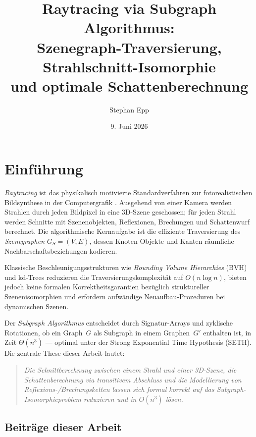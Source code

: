 ﻿\documentclass[a4paper,12pt]{article}
\title{\textbf{Raytracing via Subgraph Algorithmus:\\
Szenegraph-Traversierung, Strahlschnitt-Isomorphie\\
und optimale Schattenberechnung}}
\author{Stephan Epp}
\date{9. Juni 2026}
\theoremstyle{definition}
\begin{document}
\maketitle
\tableofcontents
\newpage

\section{Einführung}

\emph{Raytracing} ist das physikalisch motivierte Standardverfahren zur
fotorealistischen Bildsynthese in der Computergrafik \citep{Whitted1980}.
Ausgehend von einer Kamera werden Strahlen durch jeden Bildpixel in eine
3D-Szene geschossen; für jeden Strahl werden Schnitte mit Szenenobjekten,
Reflexionen, Brechungen und Schattenwurf berechnet. Die algorithmische
Kernaufgabe ist die effiziente Traversierung des \emph{Szenegraphen}
$G_S = (V, E)$, dessen Knoten Objekte und Kanten räumliche
Nachbarschaftsbeziehungen kodieren.

Klassische Beschleunigungsstrukturen wie \emph{Bounding Volume
Hierarchies} (BVH) \citep{Rubin1980} und kd-Trees \citep{Bentley1975}
reduzieren die Traversierungskomplexität auf $O(n \log n)$, bieten
jedoch keine formalen Korrektheitsgarantien bezüglich struktureller
Szenenisomorphien und erfordern aufwändige Neuaufbau-Prozeduren bei
dynamischen Szenen.

Der \emph{Subgraph Algorithmus} \citep{Epp2026} entscheidet durch
Signatur-Arrays und zyklische Rotationen, ob ein Graph~$G$ als Subgraph
in einem Graphen~$G'$ enthalten ist, in Zeit $\Theta(n^3)$ --- optimal
unter der Strong Exponential Time Hypothesis (SETH). Die zentrale These
dieser Arbeit lautet:

\begin{quote}
  \emph{Die Schnittberechnung zwischen einem Strahl und einer 3D-Szene,
  die Schattenberechnung via transitivem Abschluss und die Modellierung
  von Reflexions-/Brechungsketten lassen sich formal korrekt auf das
  Subgraph-Isomorphieproblem reduzieren und in $O(n^3)$ lösen.}
\end{quote}

\subsection{Beiträge dieser Arbeit}
\end{document}
